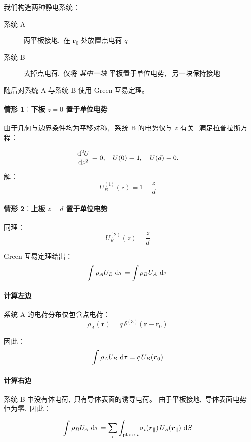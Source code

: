 我们构造两种静电系统：

\begin{description}
  \item[系统 A]  
  两平板接地, \,在 \(\boldsymbol  r_0\) 处放置点电荷 \(q\)

  \item[系统 B]  
  去掉点电荷, \,仅将 \emph{其中一块} 平板置于单位电势, \,
  另一块保持接地
\end{description}

随后对系统 A 与系统 B 使用 Green 互易定理。


\paragraph{情形 1：下板 \(z=0\) 置于单位电势}

由于几何与边界条件均为平移对称, \,
系统 B 的电势仅与 \(z\) 有关, \,满足拉普拉斯方程：

\[
\frac{\dif^2 U}{\dif z^2}=0,
\quad
U(0)=1,\quad U(d)=0.
\]

解：
\[
{
U_B^{(1)}(z)=1-\frac{z}{d}
}
\]


\paragraph{情形 2：上板 \(z=d\) 置于单位电势}

同理：
\[
{
U_B^{(2)}(z)=\frac{z}{d}
}
\]

Green 互易定理给出：
\[
\int \rho_A U_B\,\dif \tau
=
\int \rho_B U_A\,\dif \tau
\]

\paragraph{计算左边}

系统 A 的电荷分布仅包含点电荷：
\[
\rho_A(\boldsymbol  r)
=
q\,\delta^{(3)}(\boldsymbol  r-\boldsymbol  r_0)
\]

因此：
\[
\int \rho_A U_B\,\dif \tau
=
q\,U_B(\boldsymbol  r_0)
\]


\paragraph{计算右边}

系统 B 中没有体电荷, \,只有导体表面的诱导电荷。
由于平板接地, \,导体表面电势恒为零, \,因此：

\[
\int \rho_B U_A\,\dif \tau
=
\sum_i
\int_{\text{plate } i}
\sigma_i(\boldsymbol  r_\parallel)\,
U_A(\boldsymbol  r_\parallel)\,\dif S
\]

